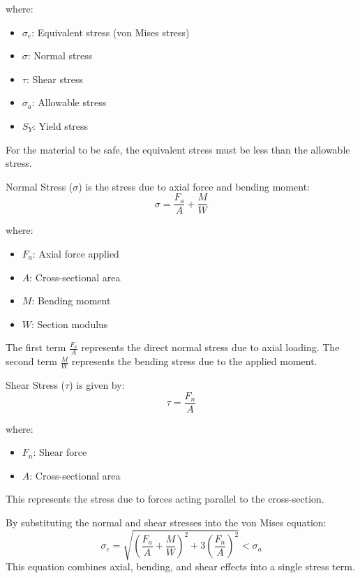\documentclass[../../main]{subfiles}
\begin{document}
where:

\begin{itemize}
    \item $\sigma_e$: Equivalent stress (von Mises stress)
    \item $\sigma$: Normal stress
    \item $\tau$: Shear stress
    \item $\sigma_a$: Allowable stress
    \item $S_Y$: Yield stress
\end{itemize}

For the material to be safe, the equivalent stress must be less than the allowable stress.

Normal Stress ($\sigma$) is the stress due to axial force and bending moment:
\begin{equation}
  \sigma = \frac{F_a}{A} + \frac{M}{W}
\end{equation}

where:

\begin{itemize}
    \item $F_a$: Axial force applied
    \item $A$: Cross-sectional area
    \item $M$: Bending moment
    \item $W$: Section modulus
\end{itemize}

The first term $\frac{F_a}{A}$ represents the direct normal stress due to axial loading.
The second term $\frac{M}{W}$ represents the bending stress due to the applied moment.

Shear Stress ($\tau$) is given by:
\begin{equation}
  \tau = \frac{F_n}{A}
\end{equation}

where:

\begin{itemize}
    \item $F_n$: Shear force
    \item $A$: Cross-sectional area
\end{itemize}

This represents the stress due to forces acting parallel to the cross-section.

By substituting the normal and shear stresses into the von Mises equation:
\begin{equation}
  \sigma_e = \sqrt{{\left(\frac{F_a}{A} + \frac{M}{W}\right)}^2 + 3{\left(\frac{F_n}{A}\right)}^2} < \sigma_a
\end{equation}
This equation combines axial, bending, and shear effects into a single stress term.
\end{document}
